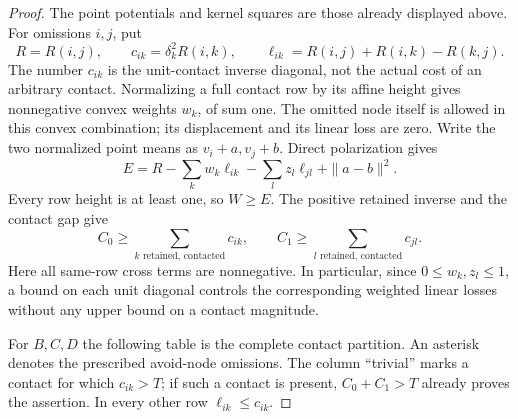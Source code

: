 \documentclass[11pt]{article}
\theoremstyle{remark}\newtheorem{remark}[theorem]{Remark}
\begin{document}
\begin{proof}
The point potentials and kernel squares are those already displayed
above. For omissions $i,j$, put
\[
 R=R(i,j),\qquad
 c_{ik}=\delta_k^2R(i,k),\qquad
 \ell_{ik}=R(i,j)+R(i,k)-R(k,j).
\]
The number $c_{ik}$ is the unit-contact inverse diagonal, not the
actual cost of an arbitrary contact. Normalizing a full contact row by
its affine height gives nonnegative convex weights $w_k$, of sum one.
The omitted node itself is allowed in this convex combination; its
displacement and its linear loss are zero. Write the two normalized
point means as $v_i+a,v_j+b$. Direct polarization gives
\begin{equation}\label{eq:full-budget-polarization}
 E=R-\sum_k w_k\ell_{ik}-\sum_l z_l\ell_{jl}
       +\|a-b\|^2.
\end{equation}
Every row height is at least one, so $W\ge E$. The positive retained
inverse and the contact gap give
\[
 C_0\ge\sum_{k\text{ retained, contacted}}c_{ik},
 \qquad
 C_1\ge\sum_{l\text{ retained, contacted}}c_{jl}.
\]
Here all same-row cross terms are nonnegative. In particular, since
$0\le w_k,z_l\le1$, a bound on each unit diagonal controls the
corresponding weighted linear losses without any upper bound on a
contact magnitude.

For $B,C,D$ the following table is the complete contact partition.
An asterisk denotes the prescribed avoid-node omissions. The column
``trivial'' marks a contact for which $c_{ik}>T$; if such a contact is
present, $C_0+C_1>T$ already proves the assertion. In every other row
$\ell_{ik}\le c_{ik}$.


\end{proof}
\end{document}

